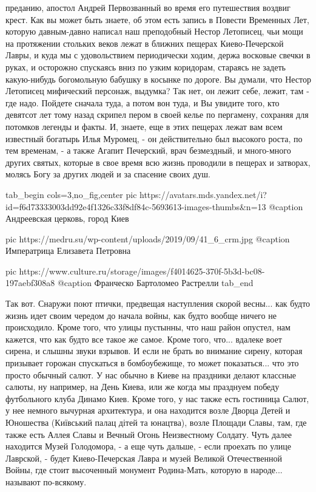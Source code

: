 преданию, апостол Андрей Первозванный во время его путешествия воздвиг крест.
Как вы может быть знаете, об этом есть запись в Повести Временных Лет, которую
давным-давно написал наш преподобный Нестор Летописец, чьи мощи на протяжении
стольких веков лежат в ближних пещерах Киево-Печерской Лавры, и куда мы с
удовольствием периодически ходим, держа восковые свечки в руках, и осторожно
спускаясь вниз по узким коридорам, стараясь не задеть какую-нибудь богомольную
бабушку в косынке по дороге. Вы думали, что Нестор Летописец мифический
персонаж, выдумка? Так нет, он лежит себе, лежит, там - где надо. Пойдете
сначала туда, а потом вон туда, и Вы увидите того, кто девятсот лет тому назад
скрипел пером в своей келье по пергамену, сохраняя для потомков легенды и
факты. И, знаете, еще в этих пещерах лежат вам всем известный богатырь Илья
Муромец, - он действительно был высокого роста, по тем временам, - а также
Агапит Печерский, врач безмездный, и много-много других святых, которые в свое
время всю жизнь проводили в пещерах и затворах, молясь Богу за других людей и
за спасение своих душ.

\ifcmt
  tab_begin cols=3,no_fig,center
     pic https://avatars.mds.yandex.net/i?id=f6d73333003dd92e4f1326c33f8df84c-5693613-images-thumbs&n=13
		 @caption Андреевская церковь, город Киев

		 pic https://medru.su/wp-content/uploads/2019/09/41_6_crm.jpg
		 @caption Императрица Елизавета Петровна

		 pic https://www.culture.ru/storage/images/f4014625-370f-5b3d-bc08-197aebf308a8
		 @caption Франческо Бартоломео Растрелли
  tab_end
\fi

Так вот. Снаружи поют птички, предвещая наступления скорой весны... как будто
жизнь идет своим чередом до начала войны, как будто вообще ничего не
происходило. Кроме того, что улицы пустынны, что наш район опустел, нам
кажется, что как будто все такое же самое. Кроме того, что... вдалеке воет
сирена, и слышны звуки взрывов.  И если не брать во внимание сирену, которая
призывает горожан спускаться в бомбоубежище, то может показаться... что это
просто обычный салют. У нас обычно в Киеве на праздники делают классные салюты,
ну например, на День Киева, или же когда мы празднуем победу футбольного клуба
Динамо Киев. Кроме того, у нас также есть гостиница Салют, у нее немного
вычурная архитектура, и она находится возле Дворца Детей и Юношества (Київський
палац дітей та юнацтва), возле Площади Славы, там, где также есть Аллея Славы и
Вечный Огонь Неизвестному Солдату. Чуть далее находится Музей Голодомора, - а
еще чуть дальше, - если проехать по улице Лаврской, - будет Киево-Печерская
Лавра и музей Великой Отечественной Войны, где стоит высоченный монумент
Родина-Мать, которую в народе... называют по-всякому. 

